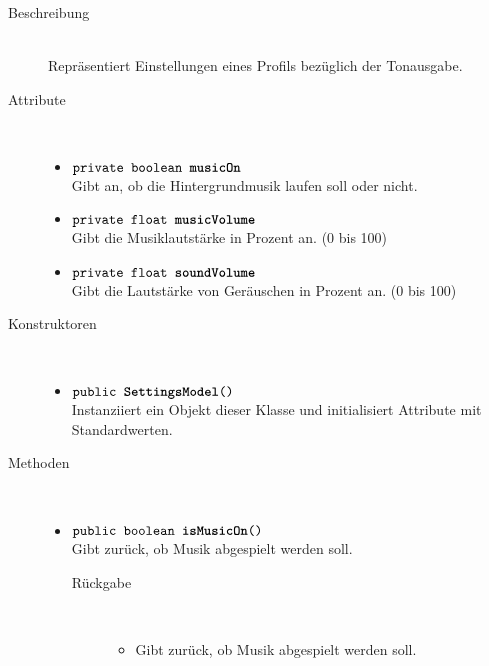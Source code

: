 \begin{description}
\item[Beschreibung] \hfill \\ Repräsentiert Einstellungen eines Profils bezüglich der Tonausgabe.

\item[Attribute] \hfill \\
	\vspace{-.8cm}
	\begin{itemize}
		\item $\texttt{private boolean \textbf{musicOn}}$ \\ Gibt an, ob die Hintergrundmusik laufen soll oder nicht.
		\item $\texttt{private float \textbf{musicVolume}}$ \\ Gibt die Musiklautstärke in Prozent an. (0 bis 100)
		\item $\texttt{private float \textbf{soundVolume}}$ \\ Gibt die Lautstärke von Geräuschen in Prozent an. (0 bis 100)
	\end{itemize}
	
\item[Konstruktoren] \hfill \\
	\vspace{-.8cm}
	\begin{itemize}
		\item $\texttt{public \textbf{SettingsModel}()}$ \\ Instanziiert ein Objekt dieser Klasse und initialisiert Attribute mit Standardwerten.
	\end{itemize}
	
\item[Methoden] \hfill \\
	\vspace{-.8cm}
	\begin{itemize}
		\item $\texttt{public boolean \textbf{isMusicOn}()}$ \\ Gibt zurück, ob Musik abgespielt werden soll.
		\begin{description}
			\item[Rückgabe] \hfill \\
			\vspace{-.8cm}
			\begin{itemize}
				\item Gibt zurück, ob Musik abgespielt werden soll.
			\end{itemize}
		\end{description}
		

\end{itemize}
\end{description}

